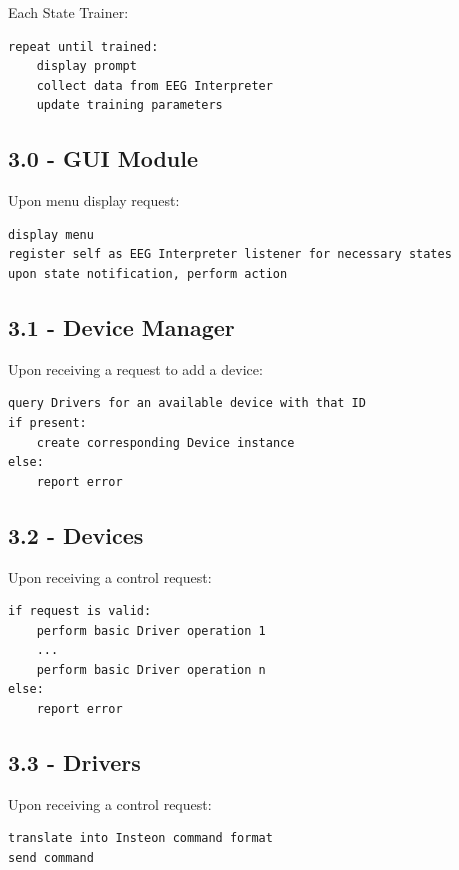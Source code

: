 \documentclass{article}
\begin{document}
Each State Trainer:

\begin{lstlisting}
repeat until trained:
    display prompt
    collect data from EEG Interpreter
    update training parameters
\end{lstlisting}

\subsection*{3.0 - GUI Module}

Upon menu display request:

\begin{lstlisting}
display menu
register self as EEG Interpreter listener for necessary states
upon state notification, perform action
\end{lstlisting}

\subsection*{3.1 - Device Manager}

Upon receiving a request to add a device:

\begin{lstlisting}
query Drivers for an available device with that ID
if present:
    create corresponding Device instance
else:
    report error
\end{lstlisting}

\subsection*{3.2 - Devices}

Upon receiving a control request:

\begin{lstlisting}
if request is valid:
    perform basic Driver operation 1
    ...
    perform basic Driver operation n
else:
    report error
\end{lstlisting}

\subsection*{3.3 - Drivers}

Upon receiving a control request:

\begin{lstlisting}
translate into Insteon command format
send command
\end{lstlisting}
\end{document}
